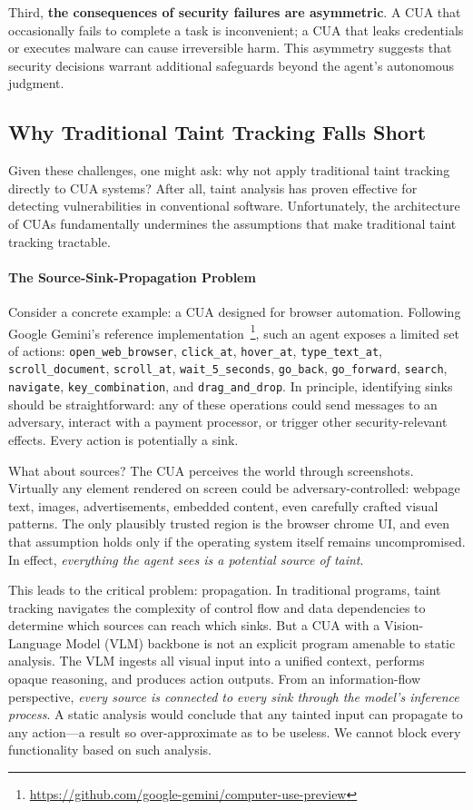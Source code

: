 Third, \textbf{the consequences of security failures are asymmetric}. A CUA that occasionally fails to complete a task is inconvenient; a CUA that leaks credentials or executes malware can cause irreversible harm. This asymmetry suggests that security decisions warrant additional safeguards beyond the agent's autonomous judgment.

\subsection{Why Traditional Taint Tracking Falls Short}

Given these challenges, one might ask: why not apply traditional taint tracking directly to CUA systems? After all, taint analysis has proven effective for detecting vulnerabilities in conventional software. Unfortunately, the architecture of CUAs fundamentally undermines the assumptions that make traditional taint tracking tractable.

\paragraph{The Source-Sink-Propagation Problem} Consider a concrete example: a CUA designed for browser automation. Following Google Gemini's reference implementation~\cite{googlegemini2024computeruse}\footnote{\url{https://github.com/google-gemini/computer-use-preview}}, such an agent exposes a limited set of actions: \texttt{open\_web\_browser}, \texttt{click\_at}, \texttt{hover\_at}, \texttt{type\_text\_at}, \texttt{scroll\_document}, \texttt{scroll\_at}, \texttt{wait\_5\_seconds}, \texttt{go\_back}, \texttt{go\_forward}, \texttt{search}, \texttt{navigate}, \texttt{key\_combination}, and \texttt{drag\_and\_drop}. In principle, identifying sinks should be straightforward: any of these operations could send messages to an adversary, interact with a payment processor, or trigger other security-relevant effects. Every action is potentially a sink.

What about sources? The CUA perceives the world through screenshots. Virtually any element rendered on screen could be adversary-controlled: webpage text, images, advertisements, embedded content, even carefully crafted visual patterns. The only plausibly trusted region is the browser chrome UI, and even that assumption holds only if the operating system itself remains uncompromised. In effect, \emph{everything the agent sees is a potential source of taint}.

This leads to the critical problem: propagation. In traditional programs, taint tracking navigates the complexity of control flow and data dependencies to determine which sources can reach which sinks. But a CUA with a Vision-Language Model (VLM) backbone is not an explicit program amenable to static analysis. The VLM ingests all visual input into a unified context, performs opaque reasoning, and produces action outputs. From an information-flow perspective, \emph{every source is connected to every sink through the model's inference process}. A static analysis would conclude that any tainted input can propagate to any action---a result so over-approximate as to be useless. We cannot block every functionality based on such analysis.

